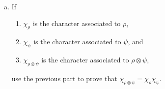 \documentclass[11pt, reqno]{amsart}
\theoremstyle{plain}
\theoremstyle{definition}
\theoremstyle{example}
\begin{document}
\begin{enumerate}[I ]
\begin{enumerate}[1.]
\begin{enumerate}[(a)]
\begin{proof}
In addition, the matrix for $(\rho \otimes \psi)(g)$ is given by,
\begin{align*}
(\rho \otimes \psi)(g) &= \rho(g) \otimes \psi(g)\\
&= \begin{pmatrix} 
			\alpha_{1,1} & \cdots & \alpha_{1,m} \\ 
			\vdots & \ddots& \vdots \\
			\alpha_{m,1} & \cdots & \alpha_{m,m} \end{pmatrix} \otimes \begin{pmatrix} 
			\beta_{1,1} & \cdots & \beta_{1,n} \\ 
			\vdots & \ddots& \vdots \\
			\beta_{n,1} & \cdots & \beta_{n,n} \end{pmatrix}\\
&= \begin{pmatrix} 
			\alpha_{1,1} \psi(g) & \cdots & \alpha_{1,m} \psi(g) \\ 
			\vdots & \ddots& \vdots \\
			\alpha_{m,1} \psi(g) & \cdots & \alpha_{m,m} \psi(g) \end{pmatrix}\\
&= \begin{pmatrix} 
			\alpha_{1,1} \beta_{1,1} & \alpha_{1,1} \beta_{1,2} & \cdots & \alpha_{1,1} \beta_{1,n} & \alpha_{1,2} \beta_{1,1} & \cdots & \alpha_{1,m} \beta_{1,n} \\ 
			\vdots & \ddots& & & & & \vdots \\
			\alpha_{m,1} \beta_{1,1} & \alpha_{m,1} \beta_{1,2} & \cdots & \alpha_{m,1} \beta_{1,n} & \alpha_{m,2} \beta_{1,1} & \cdots & \alpha_{m,m} \beta_{1,n}\\
			\vdots & & & & & & \vdots \\
			\alpha_{m,1} \beta{n, 1} & \alpha_{m,1} \beta_{n,2} & \cdots & \alpha_{m,1} \beta_{n,n} & \alpha_{m,2} \beta_{n,1} & \cdots & \alpha_{m,m} \beta_{n,n} \end{pmatrix}
\end{align*}

So our new matrix has dimension $mn$.
\end{proof}

\item If 
\begin{enumerate}[\quad]
\item $\chi_\rho$ is the character associated to $\rho$, 
\item $\chi_\psi$ is the character associated to $\psi$, and
\item $\chi_{\rho\otimes\psi}$ is the character associated to $\rho\otimes \psi$, 
\end{enumerate}
use the previous part to prove that $\chi_{\rho\otimes\psi} = \chi_\rho \chi_\psi$.


\end{enumerate}
\end{enumerate}
\end{enumerate}
\end{document}
